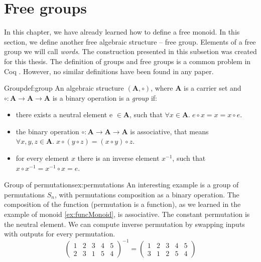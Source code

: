 \section{Free groups}
In this chapter, we have already learned how to define a free monoid. In this section, we define another free algebraic structure -- free group. Elements of a free group we will call \emph{words}. The construction presented in this subsetion was created for this thesis. The definition of groups and free groups is a common problem in Coq \cite{GroupsCoq} \cite{FreeGroupsCoq}. However, no similar definitions have been found in any paper. 
\begin{defi}{Group}{def:group}
An algebraic structure $(\mathbf{A}, \circ)$, where $\mathbf{A}$ is a carrier set and $\circ: \mathbf{A} \rightarrow  \mathbf{A} \rightarrow \mathbf{A}$ is a binary operation is a \emph{group} \cite{AbstractAlgebra} if:
\begin{itemize}
    \itemsep 0em 
    \item there exists a neutral element e $\in \mathbf{A}$, such that $\forall x \in \mathbf{A}. \; e \circ x = x = x \circ e$.
    \item the binary operation $\circ: \mathbf{A} \rightarrow \mathbf{A} \rightarrow \mathbf{A}$ is associative, that means $\forall x, y, z \in \mathbf{A}. \; x \circ (y \circ z) = (x \circ y) \circ z$.
    \item for every element $x$ there is an inverse element $x^{-1}$, such that $x \circ x^{-1} = x^{-1} \circ x = e$.
\end{itemize}
\end{defi}
\begin{example}{Group of permutations}{ex:permutations}
An interesting example is a group of permutations $S_n$, with permutations composition as a binary operation. The composition of the function (permutation is a function), as we learned in the example of monoid \ref{ex:funcMonoid}, is associative. The constant permutation is the neutral element. We can compute inverse permutation by swapping inputs with outputs for every permutation.
$$
\begin{pmatrix}
    1 & 2 & 3 & 4 & 5 \\
    2 & 3 & 1 & 5 & 4
\end{pmatrix}^{-1}
=
\begin{pmatrix}
    1 & 2 & 3 & 4 & 5 \\
    3 & 1 & 2 & 5 & 4
\end{pmatrix}
$$
\end{example}
